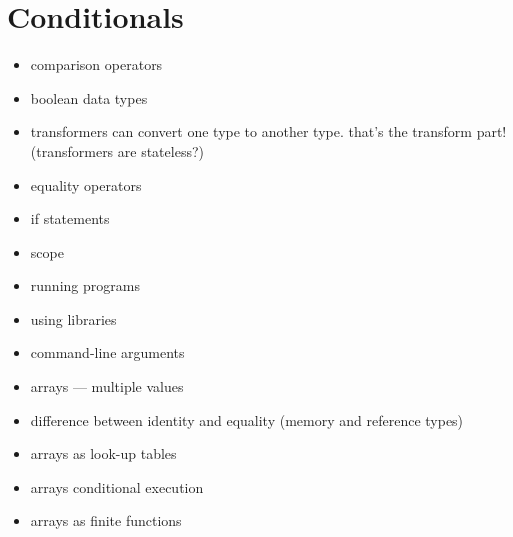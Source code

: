 \chapter[Second Friend: Conditionals]{Conditionals}

\begin{itemize}
  \item comparison operators
  \item boolean data types
  \item transformers can convert one type to another type. that's the transform part! (transformers are stateless?)
  \item equality operators
  \item if statements
  \item scope
  \item running programs
  \item using libraries
  \item command-line arguments
  \item arrays --- multiple values
  \item difference between identity and equality (memory and reference types)
  \item arrays as look-up tables
  \item arrays conditional execution
  \item arrays as finite functions
\end{itemize}
